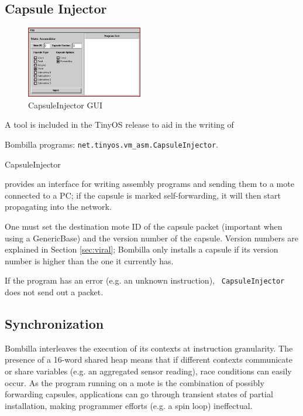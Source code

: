 \documentclass[10pt]{article}
\newcommand{\bomb}{Bombilla\xspace}
\begin{document}
\subsection{Capsule Injector}

\begin{figure}
\begin{center}
\includegraphics[width=2in]{fig/CapsuleInjector.jpg}
\caption{CapsuleInjector GUI}
\label{fig:capsuleinject}
\end{center}
\end{figure}

A tool is included in the TinyOS release to aid in the writing of

\bomb programs: {\tt net.tinyos.vm\_asm.CapsuleInjector}. {\tt

CapsuleInjector} provides an interface for writing assembly programs
and sending them to a mote connected to a PC; if the capsule is marked
self-forwarding, it will then start propagating into the network.

One must set the destination mote ID of the capsule packet (important
when using a GenericBase) and the version number of the
capsule. Version numbers are explained in Section \ref{sec:viral};
\bomb only installs a capsule if its version number is higher than
the one it currently has.


If the program has an error (e.g. an unknown instruction), {\tt
CapsuleInjector} does not send out a packet.


\subsection{Synchronization}

\bomb interleaves the execution of its contexts at instruction
granularity. The presence of a 16-word shared heap means that if
different contexts communicate or share variables (e.g. an aggregated
sensor reading), race conditions can easily occur. As the program
running on a mote is the combination of possibly forwarding capsules,
applications can go through transient states of partial installation,
making programmer efforts (e.g. a spin loop) ineffectual.
\end{document}
